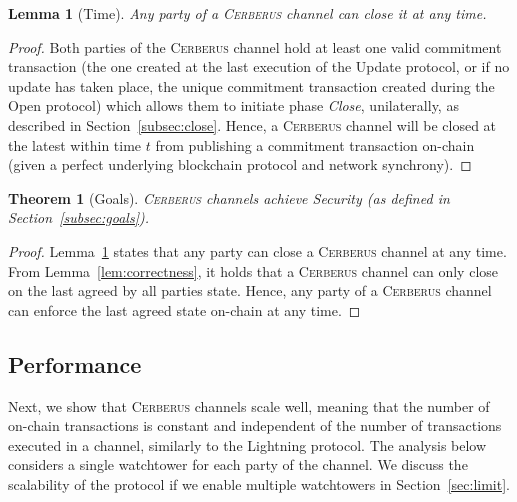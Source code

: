 \documentclass[twocolumn,showpacs,%
  nofootinbib,aps,superscriptaddress,%
  eqsecnum,prd,notitlepage,showkeys,10pt]{revtex4-1}
\newtheorem{theorem}{Theorem}
\newtheorem{lemma}{Lemma}
\newcommand{\sys}{\textsc{Cerberus}\xspace}
\begin{document}
\begin{lemma}[Time]\label{lem:time}
Any party of a \sys channel can close it at any time.
\end{lemma}
\begin{proof}
Both parties of the \sys channel hold at least one valid commitment transaction (the one created at the last execution of the Update protocol, or if no update has taken place, the unique commitment transaction created during the Open protocol) which allows them to initiate phase \textit{Close}, unilaterally, as described in Section~\ref{subsec:close}.
Hence, a \sys channel will be closed at the latest within time $t$ from publishing a commitment transaction on-chain (given a perfect underlying blockchain protocol and network synchrony).
\end{proof}


\begin{theorem}[Goals]
\sys channels achieve Security (as defined in Section~\ref{subsec:goals}).
\end{theorem}
\begin{proof}
Lemma~\ref{lem:time} states that any party can close a \sys channel at any time. From Lemma~\ref{lem:correctness}, it holds that a \sys channel can only close on the last agreed by all parties state. Hence, any party of a \sys channel can enforce the last agreed state on-chain at any time.
\end{proof}

\subsection{Performance}

Next, we show that \sys channels scale well, meaning that the number of on-chain transactions is constant and independent of the number of transactions executed in a channel, similarly to the Lightning protocol. The analysis below considers a single watchtower for each party of the channel. We discuss the scalability of the protocol if we enable multiple watchtowers in Section~\ref{sec:limit}.
\end{document}

